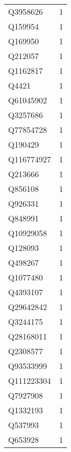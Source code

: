 \begin{tabular}{lr}
    Q3958626 &                             1 \\
     Q159954 &                             1 \\
     Q169950 &                             1 \\
     Q212057 &                             1 \\
    Q1162817 &                             1 \\
       Q4421 &                             1 \\
   Q61045902 &                             1 \\
    Q3257686 &                             1 \\
   Q77854728 &                             1 \\
     Q190429 &                             1 \\
  Q116774927 &                             1 \\
     Q213666 &                             1 \\
     Q856108 &                             1 \\
     Q926331 &                             1 \\
     Q848991 &                             1 \\
   Q10929058 &                             1 \\
     Q128093 &                             1 \\
     Q498267 &                             1 \\
    Q1077480 &                             1 \\
    Q4393107 &                             1 \\
   Q29642842 &                             1 \\
    Q3244175 &                             1 \\
   Q28168011 &                             1 \\
    Q2308577 &                             1 \\
   Q93533999 &                             1 \\
  Q111223304 &                             1 \\
    Q7927908 &                             1 \\
    Q1332193 &                             1 \\
     Q537993 &                             1 \\
     Q653928 &                             1 \\

\end{tabular}
